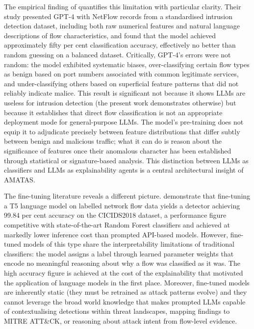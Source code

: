 The empirical finding of \textcite{Houssel2024} quantifies this limitation with particular clarity. Their study presented GPT-4 with NetFlow records from a standardised intrusion detection dataset, including both raw numerical features and natural language descriptions of flow characteristics, and found that the model achieved approximately fifty per cent classification accuracy, effectively no better than random guessing on a balanced dataset. Critically, GPT-4's errors were not random: the model exhibited systematic biases, over-classifying certain flow types as benign based on port numbers associated with common legitimate services, and under-classifying others based on superficial feature patterns that did not reliably indicate malice. This result is significant not because it shows LLMs are useless for intrusion detection (the present work demonstrates otherwise) but because it establishes that direct flow classification is not an appropriate deployment mode for general-purpose LLMs. The model's pre-training does not equip it to adjudicate precisely between feature distributions that differ subtly between benign and malicious traffic; what it can do is reason about the significance of features once their anomalous character has been established through statistical or signature-based analysis. This distinction between LLMs as classifiers and LLMs as explainability agents is a central architectural insight of AMATAS.

The fine-tuning literature reveals a different picture. \textcite{GutierrezGaleano2025} demonstrate that fine-tuning a T5 language model on labelled network flow data yields a detector achieving 99.84 per cent accuracy on the CICIDS2018 dataset, a performance figure competitive with state-of-the-art Random Forest classifiers and achieved at markedly lower inference cost than prompted API-based models. However, fine-tuned models of this type share the interpretability limitations of traditional classifiers: the model assigns a label through learned parameter weights that encode no meaningful reasoning about why a flow was classified as it was. The high accuracy figure is achieved at the cost of the explainability that motivated the application of language models in the first place. Moreover, fine-tuned models are inherently static (they must be retrained as attack patterns evolve) and they cannot leverage the broad world knowledge that makes prompted LLMs capable of contextualising detections within threat landscapes, mapping findings to MITRE ATT\&CK, or reasoning about attack intent from flow-level evidence.


